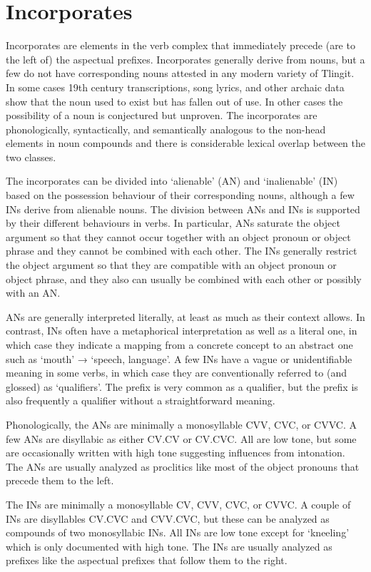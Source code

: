 
\clearpage
\section{Incorporates}\label{sec:incorporates}

\begin{multicols}{2}
\noindent
Incorporates are elements in the verb complex that immediately precede (are to the left of) the aspectual prefixes.
Incorporates generally derive from nouns, but a few do not have corresponding nouns attested in any modern variety of Tlingit.
In some cases 19th century transcriptions, song lyrics, and other archaic data show that the noun used to exist but has fallen out of use.
In other cases the possibility of a noun is conjectured but unproven.
The incorporates are phonologically, syntactically, and semantically analogous to the non-head elements in noun compounds and there is considerable lexical overlap between the two classes.

The incorporates can be divided into ‘alienable’ (AN) and ‘inalienable’ (IN) based on the possession behaviour of their corresponding nouns, although a few INs derive from alienable nouns.
The division between ANs and INs is supported by their different behaviours in verbs.
In particular, ANs saturate the object argument so that they cannot occur together with an object pronoun or object phrase and they cannot be combined with each other.
The INs generally restrict the object argument so that they are compatible with an object pronoun or object phrase, and they also can usually be combined with each other or possibly with an AN.

ANs are generally interpreted literally, at least as much as their context allows.
In contrast, INs often have a metaphorical interpretation as well as a literal one, in which case they indicate a mapping from a concrete concept to an abstract one such as ‘mouth’ → ‘speech, language’.
A few INs have a vague or unidentifiable meaning in some verbs, in which case they are conventionally referred to (and glossed) as ‘qualifiers’.
The  prefix is very common as a qualifier, but the  prefix is also frequently a qualifier without a straightforward meaning.

Phonologically, the ANs are minimally a monosyllable CVV, CVC, or CVVC.
A few ANs are disyllabic as either CV.CV or CV.CVC.
All are low tone, but some are occasionally written with high tone suggesting influences from intonation.
The ANs are usually analyzed as proclitics like most of the object pronouns that precede them to the left.

The INs are minimally a monosyllable CV, CVV, CVC, or CVVC.
A couple of INs are disyllables CV.CVC and CVV.CVC, but these can be analyzed as compounds of two monosyllabic INs.
All INs are low tone except for  ‘kneeling’ which is only documented with high tone.
The INs are usually analyzed as prefixes like the aspectual prefixes that follow them to the right.
\end{multicols}

